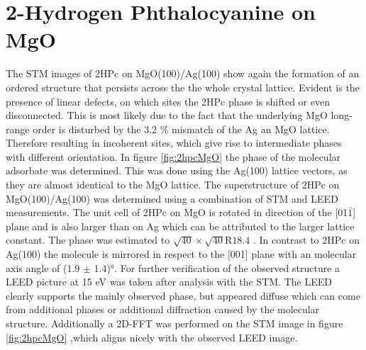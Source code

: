\section{2-Hydrogen Phthalocyanine on MgO}
The STM images of 2HPc on MgO(100)/Ag(100) show again the formation of an ordered structure that persists across the the whole crystal lattice.
Evident is the presence of linear defects, on which sites the 2HPc phase is shifted or even disconnected. 
This is most likely due to the fact that the underlying MgO long-range order is disturbed by the 3.2 \% mismatch of the Ag an MgO lattice.
Therefore resulting in incoherent sites, which give rise to intermediate phases with different orientation.
In figure \ref{fig:2hpcMgO} the phase of the molecular adsorbate was determined.
This was done using the Ag(100) lattice vectors, as they are almost identical to the MgO lattice.
The superstructure of 2HPc on MgO(100)/Ag(100) was determined using a combination of STM and LEED measurements.
The unit cell of 2HPc on MgO is rotated in direction of the [01$\bar{1}$] plane and is also larger than on Ag which can be attributed to the larger lattice constant.
The phase was estimated to $\sqrt{40} \times  \sqrt{40}\text{R}18.4$ .
In contrast to 2HPc on Ag(100) the molecule is mirrored in respect to the [001] plane with an molecular axis angle of (1.9 $\pm$ 1.4)°.
\noindent
For further verification of the observed structure a LEED picture at 15 eV was taken after analysis with the STM.
The LEED clearly supports the mainly observed phase, but appeared diffuse which can come from additional phases or additional diffraction caused by the molecular structure.
Additionally a 2D-FFT was performed on the STM image in figure \ref{fig:2hpcMgO} ,which aligns nicely with the observed LEED image.
